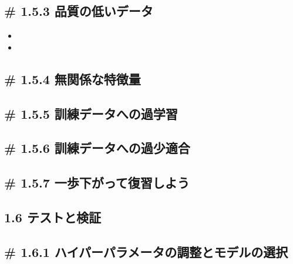 \hypertarget{ux54c1ux8ceaux306eux4f4eux3044ux30c7ux30fcux30bf}{%
\subsection{\# 1.5.3
品質の低いデータ}\label{ux54c1ux8ceaux306eux4f4eux3044ux30c7ux30fcux30bf}}

\begin{itemize}
\tightlist
\item
\item
\end{itemize}

\hypertarget{ux7121ux95a2ux4fc2ux306aux7279ux5fb4ux91cf}{%
\subsection{\# 1.5.4
無関係な特徴量}\label{ux7121ux95a2ux4fc2ux306aux7279ux5fb4ux91cf}}

\hypertarget{ux8a13ux7df4ux30c7ux30fcux30bfux3078ux306eux904eux5b66ux7fd2}{%
\subsection{\# 1.5.5
訓練データへの過学習}\label{ux8a13ux7df4ux30c7ux30fcux30bfux3078ux306eux904eux5b66ux7fd2}}

\hypertarget{ux8a13ux7df4ux30c7ux30fcux30bfux3078ux306eux904eux5c11ux9069ux5408}{%
\subsection{\# 1.5.6
訓練データへの過少適合}\label{ux8a13ux7df4ux30c7ux30fcux30bfux3078ux306eux904eux5c11ux9069ux5408}}

\hypertarget{ux4e00ux6b69ux4e0bux304cux3063ux3066ux5fa9ux7fd2ux3057ux3088ux3046}{%
\subsection{\# 1.5.7
一歩下がって復習しよう}\label{ux4e00ux6b69ux4e0bux304cux3063ux3066ux5fa9ux7fd2ux3057ux3088ux3046}}

\hypertarget{ux30c6ux30b9ux30c8ux3068ux691cux8a3c}{%
\subsection{1.6
テストと検証}\label{ux30c6ux30b9ux30c8ux3068ux691cux8a3c}}

\hypertarget{ux30cfux30a4ux30d1ux30fcux30d1ux30e9ux30e1ux30fcux30bfux306eux8abfux6574ux3068ux30e2ux30c7ux30ebux306eux9078ux629e}{%
\subsection{\# 1.6.1
ハイパーパラメータの調整とモデルの選択}\label{ux30cfux30a4ux30d1ux30fcux30d1ux30e9ux30e1ux30fcux30bfux306eux8abfux6574ux3068ux30e2ux30c7ux30ebux306eux9078ux629e}}

